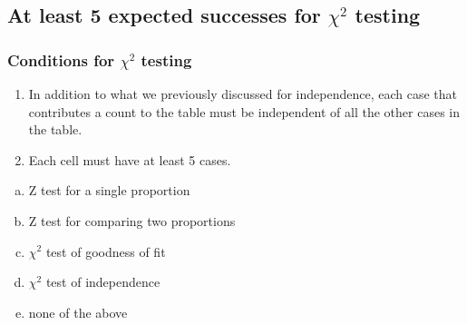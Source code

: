 \documentclass[11pt,containsverbatim,handout,xcolor=xelatex,dvipsnames,table]{beamer}
\newcommand{\solnMult}[1]{#1}
\begin{document}

\subsection{At least 5 expected successes for $\chi^2$ testing}
\label{mi3}


\begin{frame}
\frametitle{Conditions for $\chi^2$ testing}

\begin{enumerate}

\item {} In addition to what we previously discussed for independence, each case that contributes a count to the table must be independent of all the other cases in the table.

\item {} Each cell must have at least 5  cases.

\end{enumerate}

\end{frame}


\begin{frame}


\begin{enumerate}[(a)]
\item Z test for a single proportion
\item Z test for comparing two proportions
\item $\chi^2$ test of goodness of fit
\item $\chi^2$ test of independence
\item \solnMult{none of the above}
\end{enumerate}

\end{frame}
\end{document}
